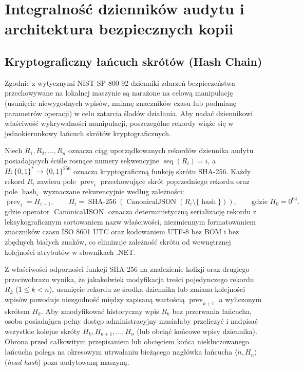 \section{Integralność dzienników audytu i architektura bezpiecznych kopii}\label{sec:kryptografia-audyt-backup}

\subsection{Kryptograficzny łańcuch skrótów (Hash Chain)}\label{subsec:hash-chain-teoria}

Zgodnie z wytycznymi NIST SP 800-92 \cite{nist-sp800-92} dzienniki zdarzeń bezpieczeństwa przechowywane na lokalnej maszynie są narażone na celową manipulację (usunięcie niewygodnych wpisów, zmianę znaczników czasu lub podmianę parametrów operacji) w celu zatarcia śladów działania. Aby nadać dziennikowi właściwość wykrywalności manipulacji, poszczególne rekordy wiąże się w jednokierunkowy łańcuch skrótów kryptograficznych.

\begin{definition}\label{def:hash-chain}
Niech $R_1, R_2, \dots, R_n$ oznacza ciąg uporządkowanych rekordów dziennika audytu posiadających ściśle rosnące numery sekwencyjne $\operatorname{seq}(R_i) = i$, a $H \colon \{0,1\}^* \to \{0,1\}^{256}$ oznacza kryptograficzną funkcję skrótu SHA-256. Każdy rekord $R_i$ zawiera pole $\operatorname{prev}_i$ przechowujące skrót poprzedniego rekordu oraz pole $\operatorname{hash}_i$ wyznaczane rekurencyjnie według zależności:
\begin{equation}\label{eq:hash-chain}
    \operatorname{prev}_i = H_{i-1}, \qquad H_i = \operatorname{SHA-256}\!\left(\operatorname{CanonicalJSON}(R_i \setminus \{\operatorname{hash}\})\right), \qquad \text{gdzie } H_0 = 0^{64}.
\end{equation}
gdzie operator $\operatorname{CanonicalJSON}$ oznacza deterministyczną serializację rekordu z leksykograficznym sortowaniem nazw właściwości, niezmiennym formatowaniem znaczników czasu ISO 8601 UTC oraz kodowaniem UTF-8 bez BOM i bez zbędnych białych znaków, co eliminuje zależność skrótu od wewnętrznej kolejności atrybutów w słownikach .NET.
\end{definition}

Z właściwości odporności funkcji SHA-256 na znalezienie kolizji oraz drugiego przeciwobrazu wynika, że jakakolwiek modyfikacja treści pojedynczego rekordu $R_k$ ($1 \le k < n$), usunięcie rekordu ze środka dziennika lub zmiana kolejności wpisów powoduje niezgodność między zapisaną wartością $\operatorname{prev}_{k+1}$ a wyliczonym skrótem $H_k$. Aby zmodyfikować historyczny wpis $R_k$ bez przerwania łańcucha, osoba posiadająca pełny dostęp administracyjny musiałaby przeliczyć i nadpisać wszystkie kolejne skróty $H_k, H_{k+1}, \dots, H_n$ (lub obciąć końcowe wpisy dziennika). Obrona przed całkowitym przepisaniem lub obcięciem końca niekluczowanego łańcucha polega na okresowym utrwalaniu bieżącego nagłówka łańcucha $\langle n, H_n \rangle$ (\textit{head hash}) poza audytowaną maszyną.

